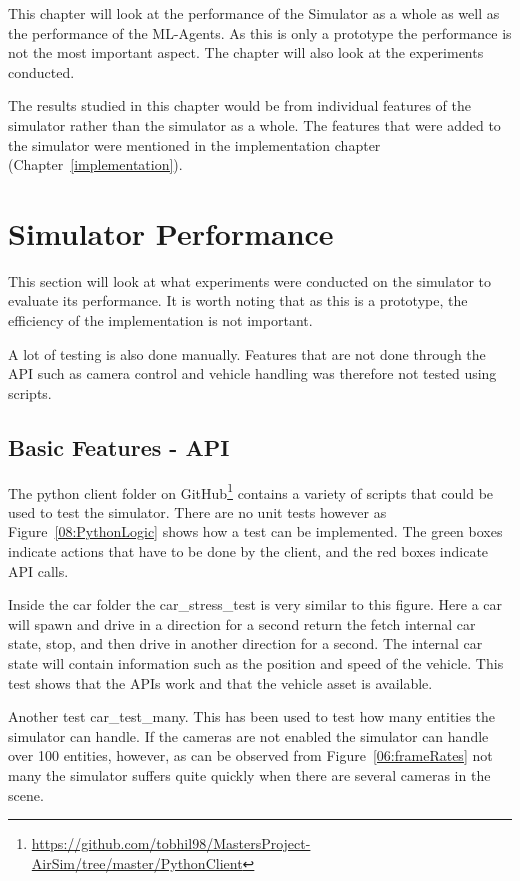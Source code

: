 This chapter will look at the performance of the Simulator as a whole as well as the performance of the ML-Agents. As this is only a prototype the performance is not the most important aspect. The chapter will also look at the experiments conducted.

The results studied in this chapter would be from individual features of the simulator rather than the simulator as a whole. The features that were added to the simulator were mentioned in the implementation chapter (Chapter~\ref{implementation}).

\section{Simulator Performance}
This section will look at what experiments were conducted on the simulator to evaluate its performance. It is worth noting that as this is a prototype, the efficiency of the implementation is not important. 

A lot of testing is also done manually. Features that are not done through the API such as camera control and vehicle handling was therefore not tested using scripts. 

\subsection{Basic Features - API}
The python client folder on GitHub\footnote{\url{https://github.com/tobhil98/MastersProject-AirSim/tree/master/PythonClient}} contains a variety of scripts that could be used to test the simulator. There are no unit tests however as  Figure~\ref{08:PythonLogic} shows how a test can be implemented. The green boxes indicate actions that have to be done by the client, and the red boxes indicate API calls. 

Inside the car folder the car\_stress\_test is very similar to this figure. Here a car will spawn and drive in a direction for a second return the fetch internal car state, stop, and then drive in another direction for a second. The internal car state will contain information such as the position and speed of the vehicle. This test shows that the APIs work and that the vehicle asset is available. 

Another test car\_test\_many. This has been used to test how many entities the simulator can handle. If the cameras are not enabled the simulator can handle over 100 entities, however, as can be observed from Figure~\ref{06:frameRates} not many the simulator suffers quite quickly when there are several cameras in the scene. 


